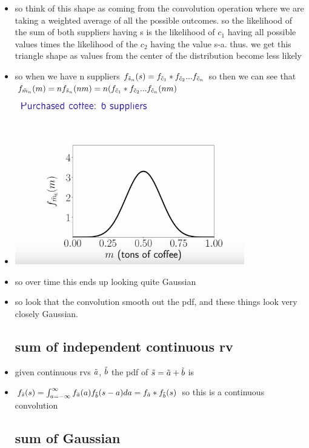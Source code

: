 \documentclass{article}
\begin{document}
\begin{itemize}
\item so think of this shape as coming from the convolution operation where we are taking a weighted average of all the possible outcomes. so the likelihood of the sum of both suppliers having s is the likelihood of $c_1$ having all possible values times the likelihood of the $c_2$ having the value s-a. thus. we get this triangle shape as values from the center of the distribution become less likely 
\item so when we have n suppliers $f_{\Tilde{s}_{n}}(s)=f_{\Tilde{c}_1}*f_{\Tilde{c}_2}...f_{\Tilde{c}_n}$ so then we can see that $f_{\Tilde{m}_{n}}(m)=nf_{\Tilde{s}_{n}}(nm)=n(f_{\Tilde{c}_1}*f_{\Tilde{c}_2}...f_{\Tilde{c}_n}(nm)$
\item \includegraphics[width=10cm]{notes/week_4/vidio 1: Why Sums And Averages Tend To Look Gaussian/immages/v1_8.jpg}
\item so over time this ends up looking quite Gaussian 
\item so look that the convolution smooth out the pdf, and these things look very closely Gaussian. 

\subsection{sum of independent continuous rv}
\item given continuous rvs $\Tilde{a}$, $\Tilde{b}$ the pdf of $\Tilde{s}=\Tilde{a}+\Tilde{b}$ is 
\item $f_{\Tilde{s}}(s)=\int_{a=-\infty}^{\infty}f_{\Tilde{a}}(a)f_{\Tilde{b}}(s-a)da=f_{\Tilde{a}}*f_{\Tilde{b}}(s)$ so this is a continuous convolution 
\subsection{sum of Gaussian}

\end{itemize}
\end{document}

